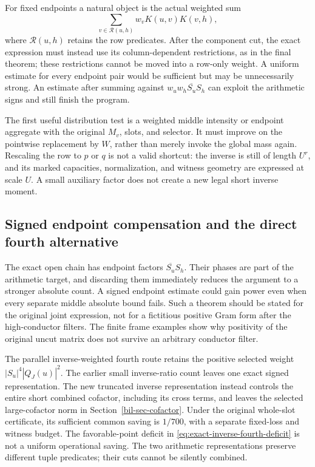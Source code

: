 \documentclass[11pt]{article}
\theoremstyle{definition}
\begin{document}
For fixed endpoints a natural object is the actual weighted sum
\[
 \sum_{v\in\mathcal R(u,h)}w_vK(u,v)K(v,h),
\]
where $\mathcal R(u,h)$ retains the row predicates. After the component cut, the exact expression must instead use its column-dependent restrictions, as in the final theorem; these restrictions cannot be moved into a row-only weight. A uniform estimate for every endpoint pair would be sufficient but may be unnecessarily strong. An estimate after summing against $w_uw_h\overline{S_u}S_h$ can exploit the arithmetic signs and still finish the program.

The first useful distribution test is a weighted middle intensity or endpoint aggregate with the original $M_v$, slots, and selector. It must improve on the pointwise replacement by $W$, rather than merely invoke the global mass again. Rescaling the row to $p$ or $q$ is not a valid shortcut: the inverse is still of length $U^r$, and its marked capacities, normalization, and witness geometry are expressed at scale $U$. A small auxiliary factor does not create a new legal short inverse moment.

\subsection{Signed endpoint compensation and the direct fourth alternative}
The exact open chain has endpoint factors $\overline{S_u}S_h$. Their phases are part of the arithmetic target, and discarding them immediately reduces the argument to a stronger absolute count. A signed endpoint estimate could gain power even when every separate middle absolute bound fails. Such a theorem should be stated for the original joint expression, not for a fictitious positive Gram form after the high-conductor filters. The finite frame examples show why positivity of the original uncut matrix does not survive an arbitrary conductor filter.

The parallel inverse-weighted fourth route retains the positive selected weight $|S_u|^4|Q_J(u)|^2$. The earlier small inverse-ratio count leaves one exact signed representation. The new truncated inverse representation instead controls the entire short combined cofactor, including its cross terms, and leaves the selected large-cofactor norm in Section~\ref{bil-sec-cofactor}. Under the original whole-slot certificate, its sufficient common saving is $1/700$, with a separate fixed-loss and witness budget. The favorable-point deficit in \eqref{eq:exact-inverse-fourth-deficit} is not a uniform operational saving. The two arithmetic representations preserve different tuple predicates; their cuts cannot be silently combined.
\end{document}
